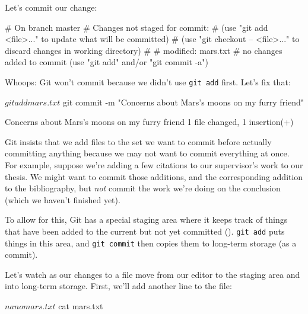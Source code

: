 \documentclass{book}
\begin{document}
Let's commit our change:


\begin{VerbOut}
# On branch master
# Changes not staged for commit:
#   (use "git add <file>..." to update what will be committed)
#   (use "git checkout -- <file>..." to discard changes in working directory)
#
#   modified:   mars.txt
#
no changes added to commit (use "git add" and/or "git commit -a")
\end{VerbOut}

Whoops: Git won't commit because we didn't use \texttt{git add} first.
Let's fix that:

\begin{VerbIn}
$ git add mars.txt
$ git commit -m "Concerns about Mars's moons on my furry friend"
\end{VerbIn}

\begin{VerbOut}
[master 34961b1] Concerns about Mars's moons on my furry friend
 1 file changed, 1 insertion(+)
\end{VerbOut}

Git insists that we add files to the set we want to commit before
actually committing anything because we may not want to commit
everything at once. For example, suppose we're adding a few citations to
our supervisor's work to our thesis. We might want to commit those
additions, and the corresponding addition to the bibliography, but
\emph{not} commit the work we're doing on the conclusion (which we
haven't finished yet).

To allow for this, Git has a special staging area where it keeps track
of things that have been added to the current
 but not yet committed ().
\texttt{git add} puts things in this area, and \texttt{git commit} then
copies them to long-term storage (as a commit).


Let's watch as our changes to a file move from our editor to the staging
area and into long-term storage. First, we'll add another line to the
file:

\begin{VerbIn}
$ nano mars.txt
$ cat mars.txt
\end{VerbIn}
\end{document}
